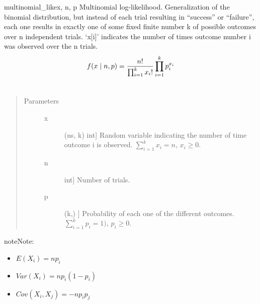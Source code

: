 \hypertarget{pymc.distributions.multinomial_like}{}\begin{funcdesc}{multinomial\_like}{x, n, p}
Multinomial log-likelihood. Generalization of the binomial
distribution, but instead of each trial resulting in ``success'' or
``failure'', each one results in exactly one of some fixed finite number k
of possible outcomes over n independent trials. `x{[}i{]}' indicates the number
of times outcome number i was observed over the n trials.
\begin{gather}
\begin{split}f(x \mid n, p) = \frac{n!}{\prod_{i=1}^k x_i!} \prod_{i=1}^k p_i^{x_i}\end{split}\notag\\\begin{split}\end{split}\notag
\end{gather}\begin{quote}\begin{description}
\item[Parameters] \leavevmode\begin{description}
\item[x] \leavevmode{[}(ns, k) int{]}
Random variable indicating the number of time outcome i is 
observed. $\sum_{i=1}^k x_i=n$, $x_i \ge 0$.

\item[n] \leavevmode{[}int{]}
Number of trials.

\item[p] \leavevmode{[}(k,) {]}
Probability of each one of the different outcomes.
$\sum_{i=1}^k p_i = 1)$, $p_i \ge 0$.

\end{description}

\end{description}\end{quote}

\begin{notice}{note}{Note:}\begin{itemize}
\item {} 
$E(X_i)=n p_i$

\item {} 
$Var(X_i)=n p_i(1-p_i)$

\item {} 
$Cov(X_i,X_j) = -n p_i p_j$

\end{itemize}
\end{notice}
\end{funcdesc}


